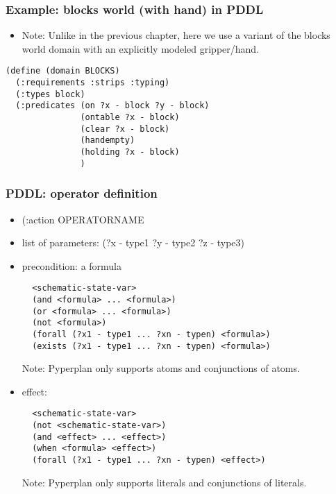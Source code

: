 \documentclass{gkibeamer}
\begin{document}
\begin{frame}[containsverbatim]
\frametitle{Example: blocks world (with hand) in PDDL}

\begin{itemize}
\item \alert{Note:} Unlike in the previous chapter, here we use a
  variant of the blocks world domain with an explicitly modeled
  gripper/hand.
\end{itemize}

\begin{verbatim}
(define (domain BLOCKS)
  (:requirements :strips :typing)
  (:types block)
  (:predicates (on ?x - block ?y - block)
               (ontable ?x - block)
               (clear ?x - block)
               (handempty)
               (holding ?x - block)
               )
\end{verbatim}

\end{frame}

\begin{frame}[containsverbatim]
\frametitle{PDDL: operator definition}

\begin{itemize}
\item (:action OPERATORNAME
\item list of parameters: (?x - type1 ?y - type2 ?z - type3)
\item precondition: a formula
\begin{verbatim}
  <schematic-state-var>
  (and <formula> ... <formula>)
  (or <formula> ... <formula>)
  (not <formula>)
  (forall (?x1 - type1 ... ?xn - typen) <formula>)
  (exists (?x1 - type1 ... ?xn - typen) <formula>)
\end{verbatim}

\alert{Note:} Pyperplan only supports atoms and conjunctions of atoms.

\end{itemize}

\end{frame}

\begin{frame}[containsverbatim]

\begin{itemize}
\item effect:
\begin{verbatim}
  <schematic-state-var>
  (not <schematic-state-var>)
  (and <effect> ... <effect>)
  (when <formula> <effect>)
  (forall (?x1 - type1 ... ?xn - typen) <effect>)
\end{verbatim}

\alert{Note:} Pyperplan only supports literals and conjunctions of literals.

\end{itemize}

\end{frame}
\end{document}
